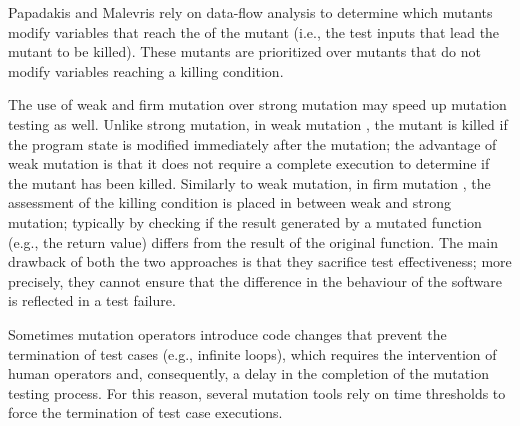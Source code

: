 Papadakis and Malevris \cite{papadakis2011automatically} rely on data-flow analysis to determine which mutants modify variables that reach the  of the mutant (i.e., the test inputs that lead the mutant to be killed). These mutants are prioritized over mutants that do not modify variables reaching a killing condition.


The use of weak and firm mutation over strong mutation may speed up mutation testing as well.
Unlike strong mutation, 
in weak mutation \cite{ammann2016introduction}, the mutant is killed if the program state is modified immediately after the mutation; the advantage of weak mutation is that it does not require a complete execution to determine if the mutant has been killed. Similarly to weak mutation, in firm mutation \cite{ammann2016introduction}, the assessment of the killing condition is placed in between weak and strong mutation; typically by checking if the result generated by a mutated function (e.g., the return value) differs from the result of the original function. The main drawback of both the two approaches is that they sacrifice test effectiveness; more precisely, they cannot ensure that the difference in the behaviour of the software is reflected in a test failure.


Sometimes mutation operators introduce code changes that prevent the termination of test cases (e.g., infinite loops), which requires the intervention of human operators and, consequently, a delay in the completion of the mutation testing process.
For this reason, several mutation tools rely on time thresholds to force the termination of test case executions. 

